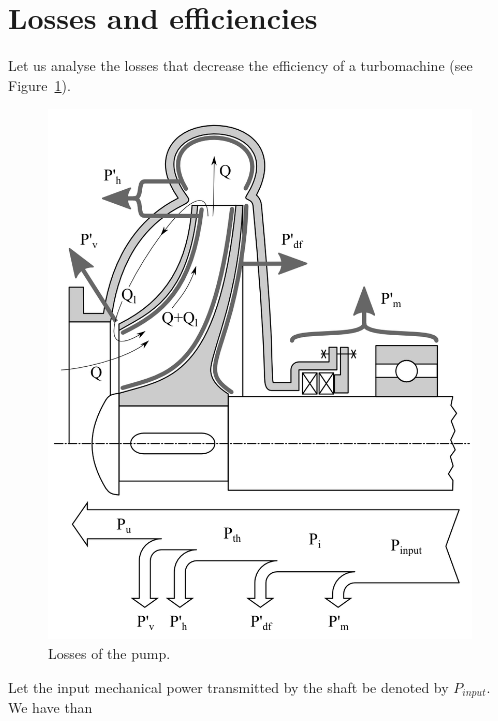 
\clearpage

\section{Losses and efficiencies}

Let us analyse the losses that decrease the efficiency of a turbomachine (see Figure~\ref{fig:PumpLosses}).

\begin{figure}[ht]
\centering
\includegraphics{figs/PumpLosses.png}
\caption{\label{fig:PumpLosses}Losses of the pump.}
\end{figure}

\noindent Let the input mechanical power transmitted by the shaft be denoted by $P_{input}$. We have than

